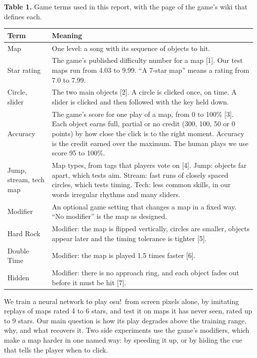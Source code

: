 \documentclass[10pt,a4paper]{article}
\begin{document}
\begin{table}[!htb]\raggedright {\small \textbf{Table 1.} Game terms used in this report, with the page of the game's wiki that defines each.\par}\vspace{3pt}\centering \small\setlength{\tabcolsep}{5pt}\renewcommand{\arraystretch}{1.12}\begin{tabularx}{\linewidth}{>{\hsize=0.676\hsize\raggedright\arraybackslash}X>{\hsize=1.324\hsize\raggedright\arraybackslash}X}\toprule
Term & Meaning \\\midrule
Map & One level: a song with its sequence of objects to hit. \\
Star rating & The game's published difficulty number for a map [1]. Our test maps run from 4.03 to 9.99. ``A 7-star map'' means a rating from 7.0 to 7.99. \\
Circle, slider & The two main objects [2]. A circle is clicked once, on time. A slider is clicked and then followed with the key held down. \\
Accuracy & The game's score for one play of a map, from 0 to 100\% [3]. Each object earns full, partial or no credit (300, 100, 50 or 0 points) by how close the click is to the right moment. Accuracy is the credit earned over the maximum. The human plays we use score 95 to 100\%. \\
Jump, stream, tech map & Map types, from tags that players vote on [4]. Jump: objects far apart, which tests aim. Stream: fast runs of closely spaced circles, which tests timing. Tech: less common skills, in our words irregular rhythms and many sliders. \\
Modifier & An optional game setting that changes a map in a fixed way. ``No modifier'' is the map as designed. \\
Hard Rock & Modifier: the map is flipped vertically, circles are smaller, objects appear later and the timing tolerance is tighter [5]. \\
Double Time & Modifier: the map is played 1.5 times faster [6]. \\
Hidden & Modifier: there is no approach ring, and each object fades out before it must be hit [7]. \\\bottomrule\end{tabularx}\end{table}

We train a neural network to play osu!\ from screen pixels alone, by imitating replays of maps rated 4 to 6 stars, and test it on maps it has never seen, rated up to 9 stars. Our main question is how its play degrades above the training range, why, and what recovers it. Two side experiments use the game's modifiers, which make a map harder in one named way: by speeding it up, or by hiding the cue that tells the player when to click.
\end{document}
